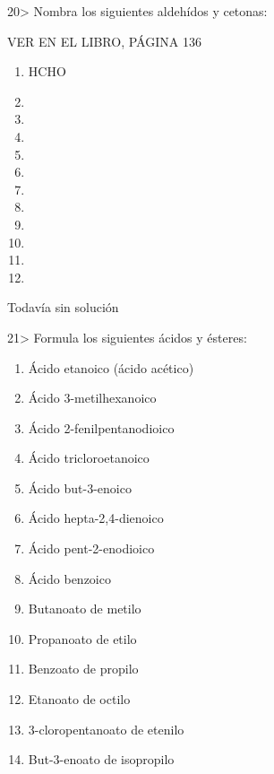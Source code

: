 \documentclass[twocolumn]{article}
\begin{document}
\begin{exercise}
  20> Nombra los siguientes aldehídos y cetonas:

  VER EN EL LIBRO, PÁGINA 136
  \begin{enumerate}
    \item HCHO
    \item {}
    \item {}
    \item {}
    \item {}
    \item {}
    \item {}
    \item {}
    \item {}
    \item {}
    \item {}
    \item {}
  \end{enumerate}

\end{exercise}

\begin{solution}[print=false]
  Todavía sin solución
\end{solution}

\begin{exercise}
  21> Formula los siguientes ácidos y ésteres:
  \begin{enumerate}
    \item Ácido etanoico (ácido acético)
    \item Ácido 3-metilhexanoico
    \item Ácido 2-fenilpentanodioico
    \item Ácido tricloroetanoico
    \item Ácido but-3-enoico
    \item Ácido hepta-2,4-dienoico
    \item Ácido pent-2-enodioico
    \item Ácido benzoico
    \item Butanoato de metilo
    \item Propanoato de etilo
    \item Benzoato de propilo
    \item Etanoato de octilo
    \item 3-cloropentanoato de etenilo
    \item But-3-enoato de isopropilo
  \end{enumerate}
\end{exercise}
\end{document}
